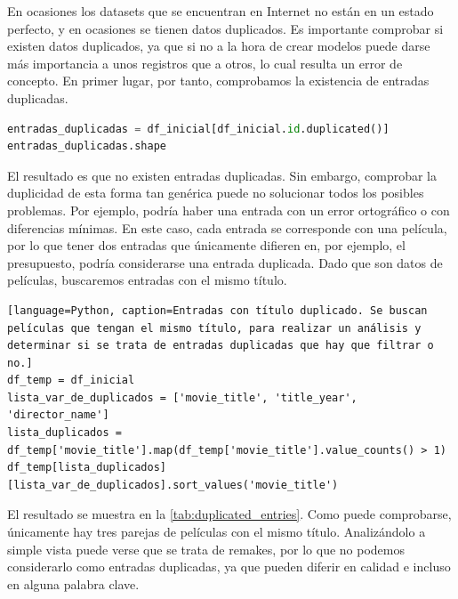 En ocasiones los datasets que se encuentran en Internet no están en un estado perfecto, y en ocasiones se tienen datos duplicados. Es importante comprobar si existen datos duplicados, ya que si no a la hora de crear modelos puede darse más importancia a unos registros que a otros, lo cual resulta un error de concepto. En primer lugar, por tanto, comprobamos la existencia de entradas duplicadas.
\begin{lstlisting}[language=Python, caption=Entradas duplicadas. Se buscan entradas duplicadas a partir del id de la película y se devuelve la canditdad de películas repetidas.]
entradas_duplicadas = df_inicial[df_inicial.id.duplicated()]
entradas_duplicadas.shape
\end{lstlisting}
El resultado es que no existen entradas duplicadas. Sin embargo, comprobar la duplicidad de esta forma tan genérica puede no solucionar todos los posibles problemas. Por ejemplo, podría haber una entrada con un error ortográfico o con diferencias mínimas. En este caso, cada entrada se corresponde con una película, por lo que tener dos entradas que únicamente difieren en, por ejemplo, el presupuesto, podría considerarse una entrada duplicada. Dado que son datos de películas, buscaremos entradas con el mismo título. 

\begin{lstlisting}[language=Python, caption=Entradas con título duplicado. Se buscan películas que tengan el mismo título, para realizar un análisis y determinar si se trata de entradas duplicadas que hay que filtrar o no.]
df_temp = df_inicial
lista_var_de_duplicados = ['movie_title', 'title_year', 'director_name']
lista_duplicados = df_temp['movie_title'].map(df_temp['movie_title'].value_counts() > 1)
df_temp[lista_duplicados][lista_var_de_duplicados].sort_values('movie_title')
\end{lstlisting}

El resultado se muestra en la \autoref{tab:duplicated_entries}. Como puede comprobarse, únicamente hay tres parejas de películas con el mismo título. Analizándolo a simple vista puede verse que se trata de remakes, por lo que no podemos considerarlo como entradas duplicadas, ya que pueden diferir en calidad e incluso en alguna palabra clave.\\


